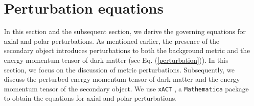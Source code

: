 \documentclass[11pt]{article}
\begin{document}
\appendix

\section{Perturbation equations}\label{App_pert}
In this section and the subsequent section, we derive the governing equations for axial and polar perturbations. As mentioned earlier, the presence of the secondary object introduces perturbations to both the background metric and the energy-momentum tensor of dark matter (see Eq. (\ref{perturbation})). In this section, we focus on the discussion of metric perturbations. Subsequently, we discuss the perturbed energy-momentum tensor of dark matter and the energy-momentum tensor of the secondary object. We use \texttt{xACT} \cite{xACT}, a \texttt{Mathematica} package to obtain the equations for axial and polar perturbations.
\end{document}
